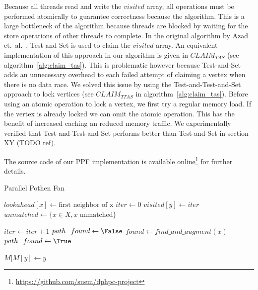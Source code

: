\documentclass[letterpaper]{article}
\begin{document}
Because all threads read and write the $visited$ array, all operations must be performed atomically to guarantee correctness because the algorithm. 
This is a large bottleneck of the algorithm because threads are blocked by waiting for the store operations of other threads to complete. 
In the original algorithm by Azad et.\ al.~\cite{Azad:2012}, Test-and-Set is used to claim the $visited$ array. 
An equivalent implementation of this approach in our algorithm is given in \texttt{$CLAIM_{TAS}$} (see algorithm~\ref{alg:claim_tas}). 
This is problematic however because Test-and-Set adds an unnecessary overhead to each failed attempt of claiming a vertex when there is no data race. 
We solved this issue by using the Test-and-Test-and-Set approach to lock vertices (see \texttt{$CLAIM_{TTAS}$} in algorithm~\ref{alg:claim_tas}).
Before using an atomic operation to lock a vertex, we first try a regular memory load. If the vertex is already locked we can omit the atomic operation. 
This has the benefit of increased caching an reduced memory traffic. We experimentally verified that Test-and-Test-and-Set performs better than Test-and-Set in section XY (TODO ref).

The source code of our PPF implementation is available online\footnote{\url{https://github.com/suem/dphpc-project}} for further details.\\

\begin{algorithm}
    \caption{Parallel Pothen Fan}
    \label{alg:ppf}
    \begin{algorithmic}[1]

        \State $lookahead[x] \gets \text{first neighbor of x}$ 
        \State $iter \gets 0$
        \State $visited[y] \gets iter$ 
        \State $unmatched \gets \{x \in X, x \ \text{unmatched}\}$

        \Repeat 
            \State $iter \gets iter + 1$        
            \State $path\_found \gets \False$        
                \State \Continue {}
            \EndIf
            \State $found \gets find\_and\_augment(x)$        
                \State $path\_found \gets \True$        
            \EndIf
        \EndFor

            \State $M[M[y] \gets y$        
        \EndFor
        
        \EndProcedure
    \end{algorithmic}
\end{algorithm}
\end{document}
